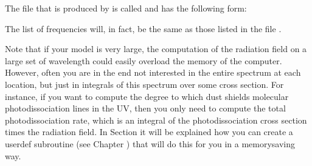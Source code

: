\documentclass[letterpaper,10pt,english]{sphinxmanual}
\begin{document}
The file that is produced by  is called
 and has the following form:

\begin{sphinxVerbatim}[commandchars=\\\{\}]
                                      
                                       
                     
\PYG{p}{[}\PYG{p}{]}
\PYG{p}{[}\PYG{p}{]}
\PYG{p}{[}\PYG{p}{]}
\PYG{p}{[}\PYG{p}{]}
\PYG{p}{[}\PYG{p}{]}
\PYG{p}{[}\PYG{p}{]}
\PYG{p}{[}\PYG{p}{]}
\PYG{p}{[}\PYG{p}{]}
\PYG{p}{[}\PYG{p}{]}
\end{sphinxVerbatim}

The list of frequencies will, in fact, be the same as those listed in the file
.

Note that if your model is very large, the computation of the radiation field on
a large set of wavelength could easily overload the memory of the
computer. However, often you are in the end not interested in the entire
spectrum at each location, but just in integrals of this spectrum over some
cross section. For instance, if you want to compute the degree to which dust
shields molecular photodissociation lines in the UV, then you only need to
compute the total photodissociation rate, which is an integral of the
photodissociation cross section times the radiation field. In Section
{\hyperref[\detokenize{internalsetup:sec-compute-radiation-integrals}]{}} it will be explained how you can create a
userdef subroutine (see Chapter {\hyperref[\detokenize{internalsetup:chap-internal-setup}]{}}) that will do this
for you in a memory\sphinxhyphen{}saving way.
\end{document}
